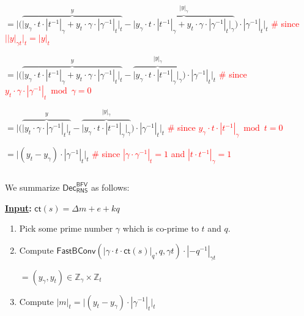 $= \Bigg|\Big( \overbrace{\Big|y_{\gamma}\cdot t \cdot |t^{-1}|_{\gamma} + y_{t}\cdot \gamma \cdot |\gamma^{-1}|_{t} \Big|_{t}}^{y} - \overbrace{\Big|y_{\gamma}\cdot t \cdot |t^{-1}|_{\gamma} + y_{t}\cdot \gamma \cdot |\gamma^{-1}|_{t}\Big|_{\gamma}}^{|y|_{\gamma}}\Big) \cdot |\gamma^{-1}|_t\Bigg|_t$ \textcolor{red}{ \# since $\Big||y|_{\gamma t}\Big|_t = |y|_t$}


$= \Bigg|\Big( \overbrace{\Big|y_{\gamma}\cdot t \cdot |t^{-1}|_{\gamma} + y_{t}\cdot \gamma \cdot |\gamma^{-1}|_{t} \Big|_t}^{y} - \overbrace{\Big|y_{\gamma}\cdot t \cdot |t^{-1}|_{\gamma}\Big|_{\gamma}}^{|y|_{\gamma}}\Big) \cdot |\gamma^{-1}|_t\Bigg|_t$ \textcolor{red}{ \# since $y_{t}\cdot \gamma \cdot |\gamma^{-1}|_{t} \bmod \gamma = 0$}

$= \Bigg|\Big( \overbrace{\Big|y_{t}\cdot \gamma \cdot |\gamma^{-1}|_{t}\Big|_t}^{y} - \overbrace{\Big|y_{\gamma}\cdot t \cdot |t^{-1}|_{\gamma}\Big|_{\gamma}}^{|y|_{\gamma}}\Big) \cdot |\gamma^{-1}|_t\Bigg|_t$ \textcolor{red}{ \# since $y_{\gamma}\cdot t \cdot |t^{-1}|_{\gamma} \bmod t = 0$}

$= \Big|(y_t - y_{\gamma}) \cdot |\gamma^{-1}|_t\Big|_t$ \textcolor{red}{ \# since $|\gamma \cdot \gamma^{-1}|_t = 1$ and $|t \cdot t^{-1}|_{\gamma} = 1$}

$ $

We summarize $\textsf{Dec}_{\textsf{RNS}}^{\textsf{BFV}}$ as follows:

\begin{tcolorbox}[title={\textbf{\tboxlabel{\ref*{subsubsec:rns-dec-bfv}} $\textsf{Dec}_{\textsf{RNS}}^{\textsf{BFV}}$}}]


\textbf{\underline{Input}:} $\textsf{ct}(s) = \Delta m + e + kq$

\begin{enumerate}
\item Pick some prime number $\gamma$ which is co-prime to $t$ and $q$.

\item Compute $\textsf{FastBConv}(|\gamma \cdot t \cdot \textsf{ct}(s)|_q, q, \gamma t) \cdot |-q^{-1}|_{\gamma t}$

$ = (y_{\gamma}, y_{t}) \in \mathbb{Z}_{\gamma} \times \mathbb{Z}_{t}$

\item Compute $|m|_t = \Big|(y_{t} - y_{\gamma})\cdot |\gamma^{-1}|_t\Big|_t$

\end{enumerate}

\end{tcolorbox}


